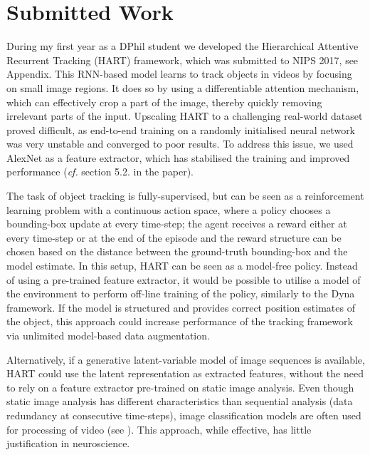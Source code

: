 \section{Submitted Work}
\label{sec:done}

    During my first year as a DPhil student we developed the Hierarchical Attentive Recurrent Tracking (HART) framework, which was submitted to NIPS 2017, see Appendix. 
    This RNN-based model learns to track objects in videos by focusing on small image regions. It does so by using a differentiable attention mechanism, which can effectively crop a part of the image, thereby quickly removing irrelevant parts of the input.
    Upscaling HART to a challenging real-world dataset proved difficult, as end-to-end training on a randomly initialised neural network was very unstable and converged to poor results. 
    To address this issue, we used AlexNet \citep{Krizhevsky2012} as a feature extractor, which has stabilised the training and improved performance (\emph{cf.} section 5.2. in the paper).
    
    The task of object tracking is fully-supervised, but can be seen as a reinforcement learning problem \citep{Zhang2017a} with a continuous action space, where a policy chooses a bounding-box update at every time-step; the agent receives a reward either at every time-step or at the end of the episode and the reward structure can be chosen based on the distance between the ground-truth bounding-box and the model estimate. In this setup, HART can be seen as a model-free policy. Instead of using a pre-trained feature extractor, it would be possible to utilise a model of the environment to perform off-line training of the policy, similarly to the Dyna framework. If the model is structured and provides correct position estimates of the object, this approach could increase performance of the tracking framework via unlimited model-based data augmentation.
    
    Alternatively, if a generative latent-variable model of image sequences is available, HART could use the latent representation as extracted features, without the need to rely on a feature extractor pre-trained on static image analysis. Even though static image analysis has different characteristics than sequential analysis (\eg data redundancy at consecutive time-steps), image classification models are often used for processing of video (see \eg \cite{Ning2016a}). 
    This approach, while effective, has little justification in neuroscience. 
    
